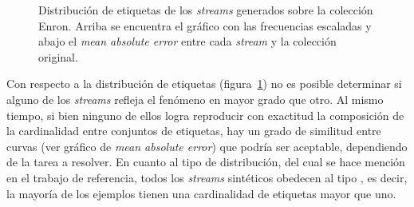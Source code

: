 \begin{figure}[htbp]
	\centering
	\qquad
	\bigskip
	\bigskip
	\caption[Distribución de etiquetas de los \textit{streams} generados sobre la colección
		Enron.]{Distribución de etiquetas de los \textit{streams} generados sobre la colección
		Enron. Arriba se encuentra el gráfico con las frecuencias escaladas y
		abajo el \textit{mean absolute error} entre cada \textit{stream} y la
		colección original.}
	\label{fig:syn_enron_label_distribution}
\end{figure}

Con respecto a la distribución de etiquetas
(figura~\ref{fig:syn_enron_label_distribution}) no es posible determinar si
alguno de los \textit{streams} refleja el fenómeno en mayor grado que otro. Al
mismo tiempo, si bien ninguno de ellos logra reproducir con exactitud la
composición de la cardinalidad entre conjuntos de etiquetas, hay un grado de
similitud entre curvas (ver gráfico de \textit{mean absolute error}) que podría
ser aceptable, dependiendo de la tarea a resolver. En cuanto al tipo de
distribución, del cual se hace mención en el trabajo de referencia, todos los
\textit{streams} sintéticos obedecen al tipo , es decir, la mayoría
de los ejemplos tienen una cardinalidad de etiquetas mayor que uno.

